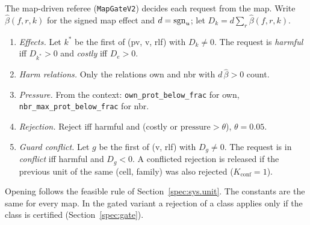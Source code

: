The map-driven referee (\texttt{MapGateV2}) decides each request from the map. Write $\hat\beta(f, r, k)$ for the signed map effect and $d = \mathrm{sgn}_u$; let $D_k = d \sum_r \hat\beta(f, r, k)$.
\begin{enumerate}
\item \emph{Effects.} Let $k^*$ be the first of (pv, v, rlf) with $D_k \neq 0$. The request is \emph{harmful} iff $D_{k^*} > 0$ and \emph{costly} iff $D_e > 0$.
\item \emph{Harm relations.} Only the relations own and nbr with $d\,\hat\beta > 0$ count.
\item \emph{Pressure.} From the context: \texttt{own\_prot\_below\_frac} for own, \texttt{nbr\_max\_prot\_below\_frac} for nbr.
\item \emph{Rejection.} Reject iff harmful and (costly or $\mathrm{pressure} > \theta$), $\theta = 0.05$.
\item \emph{Guard conflict.} Let $g$ be the first of (v, rlf) with $D_g \neq 0$. The request is in \emph{conflict} iff harmful and $D_g < 0$. A conflicted rejection is released if the previous unit of the same (cell, family) was also rejected ($K_{\mathrm{conf}} = 1$).
\end{enumerate}
Opening follows the feasible rule of Section~\ref{spec:sys.unit}. The constants are the same for every map. In the gated variant a rejection of a class applies only if the class is certified (Section~\ref{spec:gate}).

